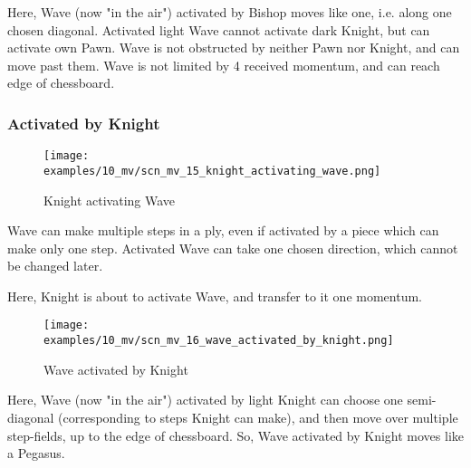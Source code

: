 Here, Wave (now "in the air") activated by Bishop moves like one, i.e. along one chosen
diagonal. Activated light Wave cannot activate dark Knight, but can activate own Pawn.
Wave is not obstructed by neither Pawn nor Knight, and can move past them. Wave is not
limited by 4 received momentum, and can reach edge of chessboard.

\clearpage %

\subsubsection*{Activated by Knight}
\label{sec:Miranda's veil/Wave/Movement/Activated by Knight}

\vspace*{-1.4\baselineskip}
\noindent
\begin{figure}[h]
\texttt{[image: examples/10\_mv/scn\_mv\_15\_knight\_activating\_wave.png]}
\caption{Knight activating Wave}
\label{fig:scn_mv_15_knight_activating_wave}
\end{figure}

Wave can make multiple steps in a ply, even if activated by a piece which can make only
one step. Activated Wave can take one chosen direction, which cannot be changed later.

Here, Knight is about to activate Wave, and transfer to it one momentum.

\clearpage %

\vspace*{-2.1\baselineskip}
\noindent
\begin{figure}[!h]
\texttt{[image: examples/10\_mv/scn\_mv\_16\_wave\_activated\_by\_knight.png]}
\caption{Wave activated by Knight}
\label{fig:scn_mv_16_wave_activated_by_knight}
\end{figure}

Here, Wave (now "in the air") activated by light Knight can choose one semi-diagonal
(corresponding to steps Knight can make), and then move over multiple step-fields, up
to the edge of chessboard. So, Wave activated by Knight moves like a Pegasus.

\clearpage %

